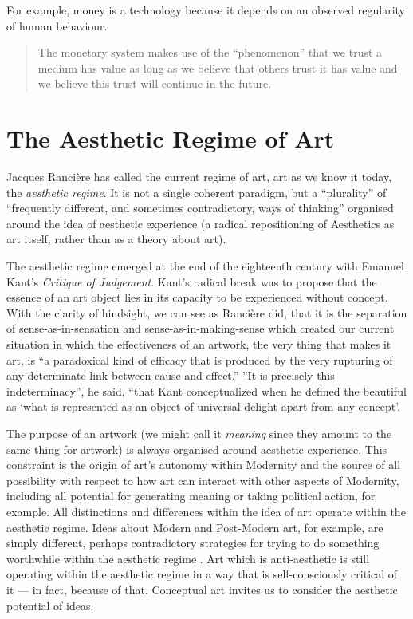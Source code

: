 \documentclass[letterpaper]{article}
\begin{document}
    For example, money is a technology because it depends on an observed regularity of human behaviour.

    \begin{quote}
        The monetary system makes use of the “phenomenon” that we trust a medium has value as long as we believe that others trust it has value and we believe this trust will continue in the future. \citep[p.55]{theNatureOfTechnology2009}
    \end{quote}

\section{The Aesthetic Regime of Art}

    Jacques Rancière has called the current regime of art, art as we know it today, the \emph{aesthetic regime}. It is not a single coherent paradigm, but a “plurality” of “frequently different, and sometimes contradictory, ways of thinking” \citep[p.8]{RanciereMdrnTms2022} organised around the idea of aesthetic experience (a radical repositioning of Aesthetics as art itself, rather than as a theory about art).
    
    The aesthetic regime emerged at the end of the eighteenth century with Emanuel Kant's \emph{Critique of Judgement}. Kant's radical break was to propose that the essence of an art object lies in its capacity to be experienced without concept. With the clarity of hindsight, we can see as Rancière did, that it is the separation of sense-as-in-sensation and sense-as-in-making-sense which created our current situation in which the effectiveness of an artwork, the very thing that makes it art, is “a paradoxical kind of efficacy that is produced by the very rupturing of any determinate link between cause and effect.” \citep[p.51]{RancierThEmncptdSpcttr2009} ”It is precisely this indeterminacy”, he said, “that Kant conceptualized when he defined the beautiful as ‘what is represented as an object of universal delight apart from any concept’. \citep[p.52]{RancierThEmncptdSpcttr2009}

    The purpose of an artwork (we might call it \emph{meaning} since they amount to the same thing for artwork) is always organised around aesthetic experience. This constraint is the origin of art's autonomy within Modernity and the source of all possibility with respect to how art can interact with other aspects of Modernity, including all potential for generating meaning or taking political action, for example. All distinctions and differences within the idea of art operate within the aesthetic regime. Ideas about Modern and Post-Modern art, for example, are simply different, perhaps contradictory strategies for trying to do something worthwhile within the aesthetic regime \citep[p213]{ZepkeSblmArt2017}. Art which is anti-aesthetic is still operating within the aesthetic regime in a way that is self-consciously critical of it — in fact, because of that. Conceptual art invites us to consider the aesthetic potential of ideas.
\end{document}
